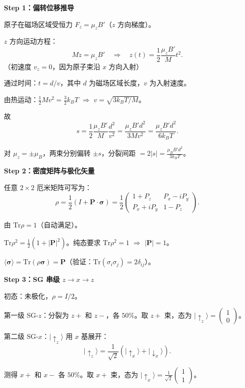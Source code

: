 \begin{derivationbox}
\textbf{Step 1：偏转位移推导}

原子在磁场区域受恒力 $F_z=\mu_z B'$（$z$ 方向梯度）。

$z$ 方向运动方程：
\[
M\ddot{z}=\mu_z B'\quad\Rightarrow\quad z(t)=\frac12\frac{\mu_z B'}{M}t^2.
\]
（初速度 $v_z=0$，因为原子束沿 $x$ 方向入射）

通过时间：$t=d/v$，其中 $d$ 为磁场区域长度，$v$ 为入射速度。

由热运动：$\frac12Mv^2=\frac32k_BT$ $\Rightarrow$ $v=\sqrt{3k_BT/M}$。

故
\[
s=\frac12\frac{\mu_z B'}{M}\frac{d^2}{v^2}=\frac{\mu_z B'd^2}{3Mv^2}
=\frac{\mu_z B'd^2}{6k_BT}.
\]

对 $\mu_z=\pm\mu_B$，两束分别偏转 $\pm s$，分裂间距 $=2|s|=\frac{\mu_B B'd^2}{3k_BT}$。

\textbf{Step 2：密度矩阵与极化矢量}

任意 $2\times2$ 厄米矩阵可写为：
\[
\rho=\frac12(I+\mathbf{P}\cdot\boldsymbol{\sigma})=\frac12\begin{pmatrix}1+P_z&P_x-iP_y\\P_x+iP_y&1-P_z\end{pmatrix}.
\]

由 $\text{Tr}\rho=1$（自动满足）。

$\text{Tr}\rho^2=\frac12(1+|\mathbf{P}|^2)$。纯态要求 $\text{Tr}\rho^2=1$ $\Rightarrow$ $|\mathbf{P}|=1$。

$\langle\boldsymbol{\sigma}\rangle=\text{Tr}(\rho\boldsymbol{\sigma})=\mathbf{P}$（验证：$\text{Tr}(\sigma_i\sigma_j)=2\delta_{ij}$）。

\textbf{Step 3：SG 串级 $z\to x\to z$}

初态：未极化，$\rho=I/2$。

第一级 SG-$z$：分裂为 $z+$ 和 $z-$，各 $50\%$。取 $z+$ 束，态为 $|\uparrow_z\rangle=\begin{pmatrix}1\\0\end{pmatrix}$。

第二级 SG-$x$：$|\uparrow_z\rangle$ 用 $x$ 基展开：
\[
|\uparrow_z\rangle=\frac{1}{\sqrt{2}}(|\uparrow_x\rangle+|\downarrow_x\rangle).
\]

测得 $x+$ 和 $x-$ 各 $50\%$。取 $x+$ 束，态为 $|\uparrow_x\rangle=\frac{1}{\sqrt{2}}\begin{pmatrix}1\\1\end{pmatrix}$。


\end{derivationbox}
